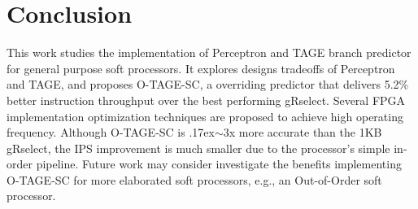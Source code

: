 \documentclass[conference]{IEEEtran}
\newcommand{\mytilde}{{\raise.17ex\hbox{$\scriptstyle\sim$}}}
\newcommand{\kfig}[4]{ %
        \begin{figure}[!t]
        \centering
        \texttt{[image: Figures/\#1]}
        \vspace{-1mm}
        \caption{#3}
        \label{#2}
        \end{figure}
}
\begin{document}


\section{Conclusion}
This work studies the implementation of Perceptron and TAGE branch predictor for general purpose soft processors. It explores designs tradeoffs of Perceptron and TAGE, and proposes \mbox{O-TAGE-SC}, a overriding predictor that delivers 5.2\% better instruction throughput over the best performing gRselect. Several FPGA implementation optimization techniques are proposed to achieve high operating frequency. Although \mbox{O-TAGE-SC} is \mytilde 3x more accurate than the 1KB gRselect, the IPS improvement is much smaller due to the processor's simple in-order pipeline. Future work may consider investigate the benefits implementing \mbox{O-TAGE-SC} for more elaborated soft processors, e.g., an Out-of-Order soft processor. 









\end{document}
